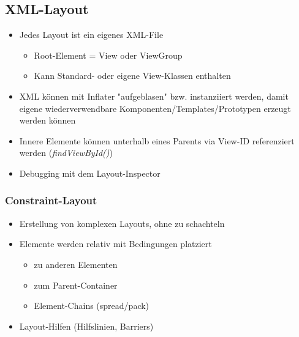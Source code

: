 \documentclass[a4paper]{article}
\begin{document}
\subsection{XML-Layout}
\begin{itemize}
	\item Jedes Layout ist ein eigenes XML-File
	\begin{itemize}
		\item Root-Element = View oder ViewGroup
		\item Kann Standard- oder eigene View-Klassen enthalten
	\end{itemize}
	\item XML können mit Inflater "aufgeblasen" bzw. instanziiert werden, damit eigene wiederverwendbare Komponenten/Templates/Prototypen erzeugt werden können
	\item Innere Elemente können unterhalb eines Parents via View-ID referenziert werden (\textit{findViewById()})
	\item Debugging mit dem Layout-Inspector	
\end{itemize}

\subsubsection{Constraint-Layout}
\begin{itemize}
	\item Erstellung von komplexen Layouts, ohne zu schachteln
	\item Elemente werden relativ mit Bedingungen platziert
	\begin{itemize}
		\item zu anderen Elementen
		\item zum Parent-Container
		\item Element-Chains (spread/pack)
	\end{itemize}
	\item Layout-Hilfen (Hilfslinien, Barriers)
\end{itemize}
\end{document}

